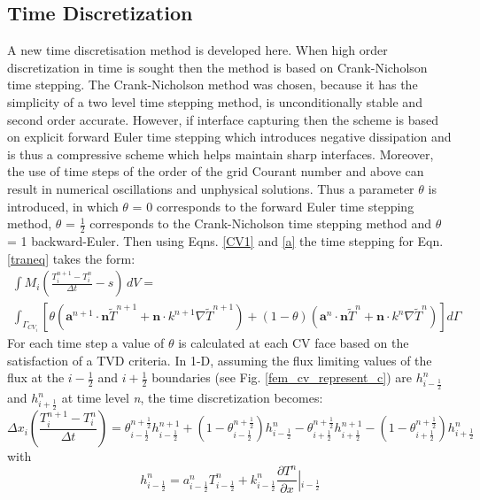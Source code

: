 \subsection{Time Discretization} \label{time_discretisation}
A new time discretisation method is developed here. When high order discretization in time 
is sought then the method is based on Crank-Nicholson time stepping.  The Crank-Nicholson method was chosen, because it has the simplicity of a two level time stepping method, is unconditionally stable and second order accurate. 
However, if interface capturing then the scheme is based on explicit forward Euler time stepping which 
introduces negative dissipation and is thus a compressive scheme which helps maintain sharp interfaces. 
Moreover, the use of time steps of the order of the grid Courant number and above can result in numerical oscillations and unphysical solutions. Thus a parameter $\theta$ is introduced, in which $\theta$ = 0 corresponds to the forward Euler time stepping method, 
$\theta$ = $\frac{1}{2}$ corresponds to the Crank-Nicholson time stepping method and $\theta$ = 1 backward-Euler.
Then using Eqns. \ref{CV1} and \ref{a} the time stepping for Eqn. \ref{traneq} takes the form:
\begin{eqnarray}
\int M_i \left( \frac{T_{i}^{n+1} -T_{i}^{n}}{\Delta t} - s \right) \,dV= \nonumber \\
\int_{\Gamma_{CV_{i}}} \left[\theta\left(\mathbf{a}^{n+1}\cdot \mathbf{n} \widetilde{T}^{n+1}
+\mathbf{n}\cdot k^{n+1}\nabla \widetilde{T}^{n+1}   \right)+\left(1-\theta\right)\left(\mathbf{a}^{n}\cdot \mathbf{n} \widetilde{T}^{n}
+\mathbf{n}\cdot k^{n}\nabla \widetilde{T}^{n}
 \right)  \right]d\Gamma
 \label{theta}
\end{eqnarray}
For each time step a value of $\theta$ is calculated at each CV face based on the satisfaction of a TVD criteria. In 1-D, assuming the flux limiting values of the flux at the $i-{\frac{1}{2}}$ and $i+{\frac{1}{2}}$ boundaries (see Fig. \ref{fem_cv_represent_c}) are $h^{n}_{i-{\frac{1}{2}}}$ and $h^{n}_{i+{\frac{1}{2}}}$ at time level \textit{n},  the time discretization becomes:
\begin{equation}
\Delta x_i \left( \frac{T_{i}^{n+1} - T_{i}^{n}}{\Delta t} \right)
= \theta_{i-\frac{1}{2}}^{n+{\frac{1}{2}}} h_{i-\frac{1}{2}}^{n+1}
+(1-\theta_{i-\frac{1}{2}}^{n+{\frac{1}{2}}}) h_{i-\frac{1}{2}}^n
-\theta_{i+\frac{1}{2}}^{n+\frac{1}{2}} h_{i+\frac{1}{2}}^{n+1}
-(1-\theta_{i+\frac{1}{2}}^{n+\frac{1}{2}}) h_{i+\frac{1}{2}}^n
\label{thetareq1}
\end{equation}
with
\begin{displaymath}
h_{i-\frac{1}{2}}^{n} = a_{i-\frac{1}{2}}^{n}
T_{i-\frac{1}{2}}^{n}
 +k_{i-\frac{1}{2}}^n \frac{\partial
T^n}{\partial x}\left\vert_{i-\frac{1}{2}}\right.
\end{displaymath}

